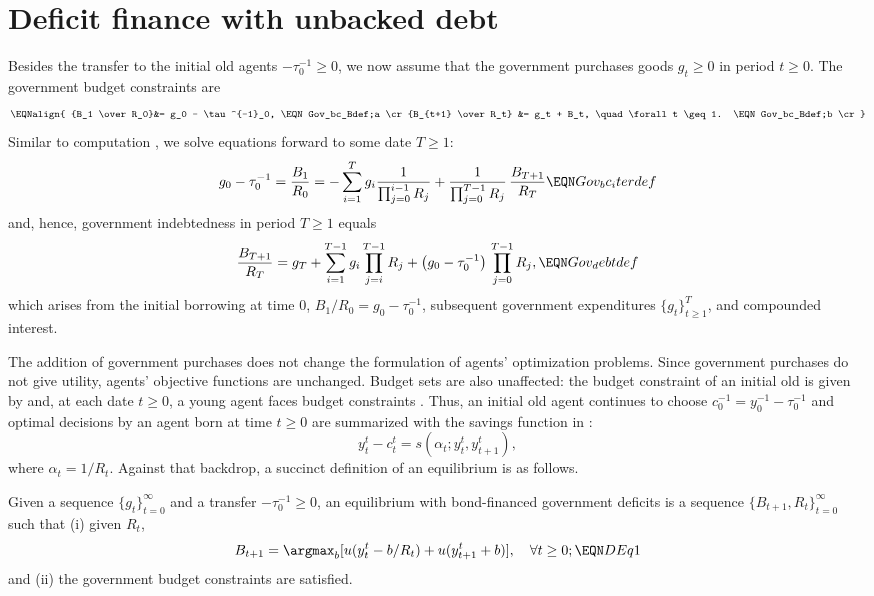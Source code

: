 \section{Deficit finance with unbacked debt}

Besides the transfer to the initial old agents $-\tau^{-1}_0\geq 0$,
we now assume that the government purchases goods $g_t\geq 0$ in
period $t\geq 0$. The government budget constraints are 
$$\EQNalign{ {B_1 \over R_0}&= g_0 - \tau^{-1}_0,    \EQN Gov_bc_Bdef;a \cr
        {B_{t+1} \over R_t} &= g_t + B_t,  \quad \forall t \geq 1. 
                                                  \EQN Gov_bc_Bdef;b \cr} $$
Similar to computation , we solve equations  
forward to some date $T\geq 1$:
$$ g_0-\tau^{-1}_0 = {B_1 \over R_0}
= - \sum_{i=1}^T g_i {1 \over \prod_{j=0}^{i-1} R_j} 
+  {1 \over \prod_{j=0}^{T-1} R_j}\, {B_{T+1} \over R_{T} } \EQN Gov_bc_iterdef
$$
and, hence, government indebtedness in period $T\geq 1$ equals
$$ {B_{T+1} \over R_{T} } = g_T + \sum_{i=1}^{T-1} g_i \prod_{j=i}^{T-1} R_j 
+ \left(g_0-\tau^{-1}_0\right) \, \prod_{j=0}^{T-1} R_j , \EQN Gov_debtdef
$$
which arises from the initial borrowing at time 0, $B_1/R_0=g_0-\tau^{-1}_0$,
subsequent government expenditures $\{g_t\}_{t\geq 1}^{T}$, and compounded 
interest.

The addition of government purchases does not change the 
formulation of agents' optimization problems. Since government 
purchases do not give utility, agents' objective functions are
unchanged. Budget sets are also unaffected: 
the budget constraint of an initial old is given by 
 and, at each date $t\geq 0$, a young agent faces 
budget constraints . Thus, an initial old agent
continues to choose $c^{-1}_0=y^{-1}_0 - \tau^{-1}_0$ and
optimal decisions by an agent born at time $t\geq 0$ are summarized
with the savings function in :
$$ y_t^t - c_t^t = s(\alpha_t; y_t^t, y_{t+1}^t),$$
where $\alpha_t=1/R_t$. Against that backdrop, a succinct 
definition of an equilibrium is as follows.

\medskip
{}  Given a sequence 
$\{g_t\}_{t=0}^\infty$ and a transfer 
$-\tau^{-1}_0\geq 0$, an equilibrium with bond-financed 
government deficits is a sequence 
$\{B_{t+1}, R_t\}_{t=0}^\infty$ such that 
(i) given $R_t$,
$$ B_{t+1} = \argmax_{b} [ u(y_t^t - b/R_t)
    + u(y^t_{t+1} + b)],  \quad \forall t \geq 0; \EQN DEq1$$
and (ii) the government budget constraints 
are satisfied.

